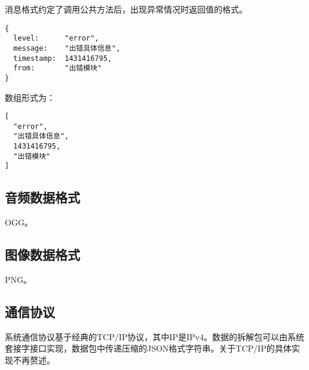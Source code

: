 \documentclass[cs4size,a4paper,nofonts]{ctexart}
\begin{document}
消息格式约定了调用公共方法后，出现异常情况时返回值的格式。

\begin{Verbatim}
{
  level:      "error",
  message:    "出错具体信息",
  timestamp:  1431416795,
  from:       "出错模块"
}
\end{Verbatim}

数组形式为：

\begin{Verbatim}
[
  "error",
  "出错具体信息",
  1431416795,
  "出错模块"
]
\end{Verbatim}





\subsection{音频数据格式}\label{sec:音频数据格式}

OGG。

\subsection{图像数据格式}\label{sec:图像数据格式}

PNG。

\subsection{通信协议}\label{sec:通信协议}

系统通信协议基于经典的TCP/IP协议，其中IP是IPv4。数据的拆解包可以由系统套接字接口实现，数据包中传递压缩的JSON格式字符串。关于TCP/IP的具体实现不再赘述。
\end{document}
